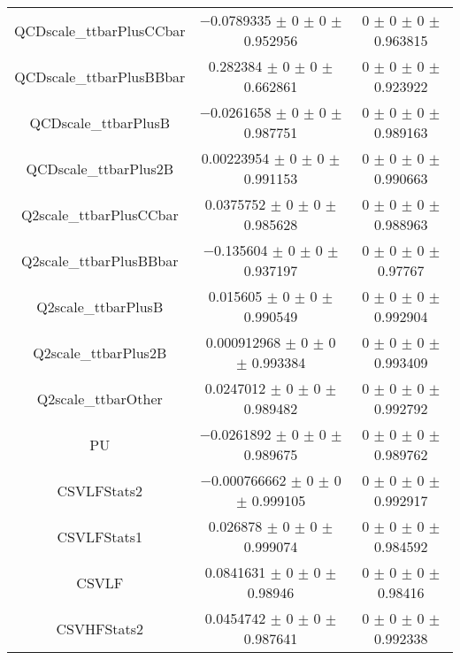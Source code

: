 \begin{table}
\begin{tabular}{ccc}
QCDscale\_ttbarPlusCCbar & \num{-0.0789335} $\pm$ \num{0} $\pm$ \num{0} $\pm$ \num{0.952956} & \num{0} $\pm$ \num{0} $\pm$ \num{0} $\pm$ \num{0.963815}\\
QCDscale\_ttbarPlusBBbar & \num{0.282384} $\pm$ \num{0} $\pm$ \num{0} $\pm$ \num{0.662861} & \num{0} $\pm$ \num{0} $\pm$ \num{0} $\pm$ \num{0.923922}\\
QCDscale\_ttbarPlusB & \num{-0.0261658} $\pm$ \num{0} $\pm$ \num{0} $\pm$ \num{0.987751} & \num{0} $\pm$ \num{0} $\pm$ \num{0} $\pm$ \num{0.989163}\\
QCDscale\_ttbarPlus2B & \num{0.00223954} $\pm$ \num{0} $\pm$ \num{0} $\pm$ \num{0.991153} & \num{0} $\pm$ \num{0} $\pm$ \num{0} $\pm$ \num{0.990663}\\
Q2scale\_ttbarPlusCCbar & \num{0.0375752} $\pm$ \num{0} $\pm$ \num{0} $\pm$ \num{0.985628} & \num{0} $\pm$ \num{0} $\pm$ \num{0} $\pm$ \num{0.988963}\\
Q2scale\_ttbarPlusBBbar & \num{-0.135604} $\pm$ \num{0} $\pm$ \num{0} $\pm$ \num{0.937197} & \num{0} $\pm$ \num{0} $\pm$ \num{0} $\pm$ \num{0.97767}\\
Q2scale\_ttbarPlusB & \num{0.015605} $\pm$ \num{0} $\pm$ \num{0} $\pm$ \num{0.990549} & \num{0} $\pm$ \num{0} $\pm$ \num{0} $\pm$ \num{0.992904}\\
Q2scale\_ttbarPlus2B & \num{0.000912968} $\pm$ \num{0} $\pm$ \num{0} $\pm$ \num{0.993384} & \num{0} $\pm$ \num{0} $\pm$ \num{0} $\pm$ \num{0.993409}\\
Q2scale\_ttbarOther & \num{0.0247012} $\pm$ \num{0} $\pm$ \num{0} $\pm$ \num{0.989482} & \num{0} $\pm$ \num{0} $\pm$ \num{0} $\pm$ \num{0.992792}\\
PU & \num{-0.0261892} $\pm$ \num{0} $\pm$ \num{0} $\pm$ \num{0.989675} & \num{0} $\pm$ \num{0} $\pm$ \num{0} $\pm$ \num{0.989762}\\
CSVLFStats2 & \num{-0.000766662} $\pm$ \num{0} $\pm$ \num{0} $\pm$ \num{0.999105} & \num{0} $\pm$ \num{0} $\pm$ \num{0} $\pm$ \num{0.992917}\\
CSVLFStats1 & \num{0.026878} $\pm$ \num{0} $\pm$ \num{0} $\pm$ \num{0.999074} & \num{0} $\pm$ \num{0} $\pm$ \num{0} $\pm$ \num{0.984592}\\
CSVLF & \num{0.0841631} $\pm$ \num{0} $\pm$ \num{0} $\pm$ \num{0.98946} & \num{0} $\pm$ \num{0} $\pm$ \num{0} $\pm$ \num{0.98416}\\
CSVHFStats2 & \num{0.0454742} $\pm$ \num{0} $\pm$ \num{0} $\pm$ \num{0.987641} & \num{0} $\pm$ \num{0} $\pm$ \num{0} $\pm$ \num{0.992338}\\

\end{tabular}
\end{table}
